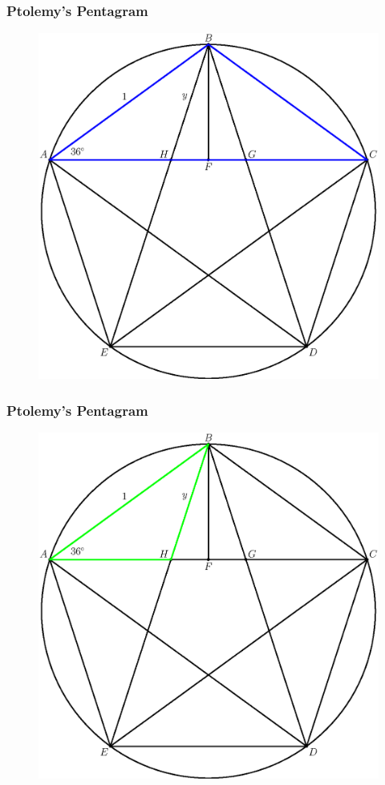 \documentclass[xcolor=dvipsnames]{beamer}
\begin{document}
\begin{frame}
  \frametitle{Ptolemy's Pentagram}
    \begin{figure}[h]
    \includegraphics[scale=.6]{./ptolemy2.eps}
  \end{figure}
\end{frame}

\begin{frame}
  \frametitle{Ptolemy's Pentagram}
    \begin{figure}[h]
    \includegraphics[scale=.6]{./ptolemy3.eps}
  \end{figure}
\end{frame}
\end{document}

